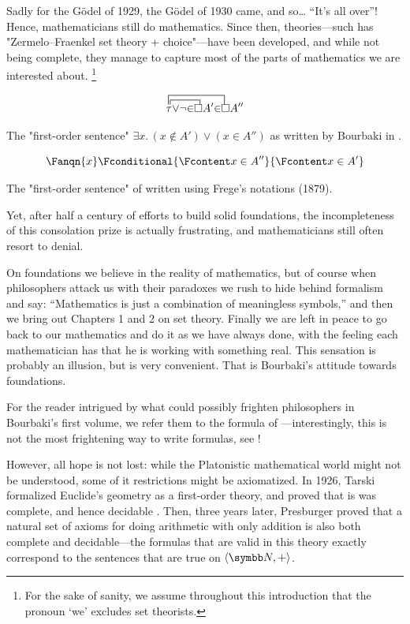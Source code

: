 Sadly for the Gödel of 1929, the Gödel of 1930 came, and so… ``It's all over''!
Hence, mathematicians still do mathematics. Since then, theories---such has
"Zermelo–Fraenkel set theory + choice"---have been developed, and while not being complete, they 
manage to capture most of the parts of mathematics we are interested about.%
\footnote{For the sake of sanity, we assume
throughout this introduction that the pronoun `we' excludes set theorists.}
\begin{marginfigure}
	\centering
	\[
	\contraction{}{\tau\,}{{\vee} {\neg} {\in}}{\!\square}
	\contraction[2ex]{}{\tau\!}{{\vee} {\neg} {\in} \square A' {\in}}{\square}
	\tau {\vee} {\neg} {\in} \square A' {\in} \square A''
	\]
	\caption{\AP\label{fig:intro-bourbaki}
	The "first-order sentence" $\exists x.\, (x \not\in A') \lor (x \in A'')$
	as written by Bourbaki in \cite[\S~1]{Bourbaki2006Logique}.
	}
\end{marginfigure}
\begin{marginfigure}
	\centering
	\[
		\Fanqn{x}\Fconditional{\Fcontent x \in A''}{\Fcontent x \in A'}
	\]
	\caption{\AP\label{fig:intro-frege}
		The "first-order sentence" of 
		written using Frege's notations (1879).
	}
\end{marginfigure}
Yet, after half a century of efforts to build solid foundations,
the incompleteness of this consolation prize is actually frustrating,
and mathematicians still often resort to denial.
\begin{displayquote}
	On foundations we believe in the reality of mathematics, but of course when philosophers attack us with their paradoxes we rush to hide behind formalism and say: ``Mathematics is just a combination of meaningless symbols,'' and then we bring out Chapters 1 and 2 on set theory. Finally we are left in peace to go back to our mathematics and do it as we have always done, with the feeling each mathematician has that he is working with something real.
	This sensation is probably an illusion, but is very convenient. That is Bourbaki's attitude towards foundations.	
\end{displayquote}
For the reader intrigued by what could possibly frighten philosophers in Bourbaki's first volume,
we refer them to the formula of ---interestingly, this is not the most 
frightening way to write formulas, see !

However, all hope is not lost: while the Platonistic mathematical world might
not be understood, some of it restrictions might be axiomatized.
In 1926, Tarski formalized Euclide's geometry as a first-order theory, and proved
that is was complete, and hence decidable .
Then, three years later, Presburger proved that a natural set of axioms for doing
arithmetic with only addition is also both complete and decidable---the formulas
that are valid in this theory exactly correspond to the sentences that are true on $\tup{\N,+}$.


